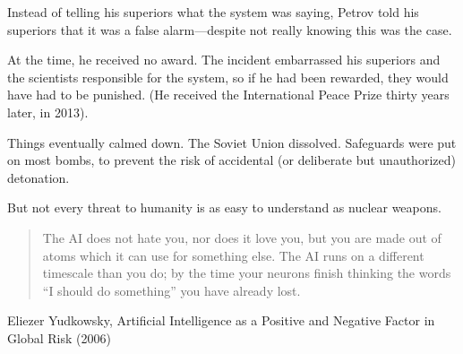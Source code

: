 \documentclass{article}
\begin{document}
{{{{Instead of telling his superiors what the system was saying, Petrov told his
superiors that it was a false alarm—despite not really knowing this was the
case.

\divider

At the time, he received no award. The incident embarrassed his superiors and
the scientists responsible for the system, so if he had been rewarded, they
would have had to be punished. (He received the International Peace Prize
thirty years later, in 2013).

\divider

Things eventually calmed down. The Soviet Union dissolved. Safeguards were put
on most bombs, to prevent the risk of accidental (or deliberate but
unauthorized) detonation.

But not every threat to humanity is as easy to understand as nuclear weapons.

\divider

\blockquote{The AI does not hate you, nor does it love you, but you are made
out of atoms which it can use for something else. The AI runs on a different
timescale than you do; by the time your neurons finish thinking the words ``I
should do something'' you have already lost.}{Eliezer Yudkowsky, Artificial
Intelligence as a Positive and Negative Factor in Global Risk (2006)}

}


}}}
\end{document}
